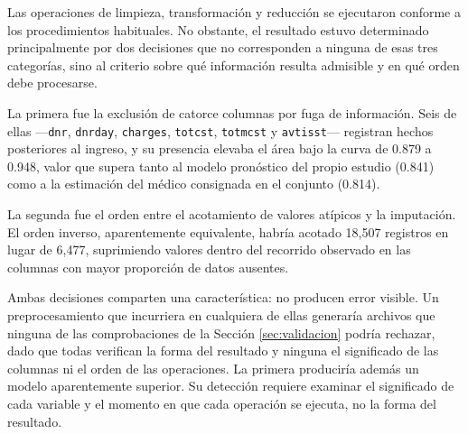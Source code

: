 \documentclass[11pt]{article}
\begin{document}
Las operaciones de limpieza, transformación y reducción se ejecutaron conforme a los
procedimientos habituales. No obstante, el resultado estuvo determinado principalmente por dos
decisiones que no corresponden a ninguna de esas tres categorías, sino al criterio sobre qué
información resulta admisible y en qué orden debe procesarse.

La primera fue la exclusión de catorce columnas por fuga de información. Seis de ellas
—\texttt{dnr}, \texttt{dnrday}, \texttt{charges}, \texttt{totcst}, \texttt{totmcst} y
\texttt{avtisst}— registran hechos posteriores al ingreso, y su presencia elevaba el área bajo la
curva de 0.879 a 0.948, valor que supera tanto al modelo pronóstico del propio estudio (0.841)
como a la estimación del médico consignada en el conjunto (0.814).

La segunda fue el orden entre el acotamiento de valores atípicos y la imputación. El orden
inverso, aparentemente equivalente, habría acotado 18{,}507 registros en lugar de 6{,}477,
suprimiendo valores dentro del recorrido observado en las columnas con mayor proporción de datos
ausentes.

Ambas decisiones comparten una característica: no producen error visible. Un preprocesamiento que
incurriera en cualquiera de ellas generaría archivos que ninguna de las comprobaciones de la
Sección \ref{sec:validacion} podría rechazar, dado que todas verifican la forma del resultado y
ninguna el significado de las columnas ni el orden de las operaciones. La primera
produciría además un modelo aparentemente superior. Su detección requiere examinar el significado
de cada variable y el momento en que cada operación se ejecuta, no la forma del resultado.

\printbibliography[title={Referencias}]
\end{document}
